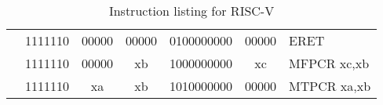 \begin{table}[p]
\begin{small}
\begin{center}
\begin{tabular}{rcccccccccl}
&
\multicolumn{2}{|c|}{1111110} &
\multicolumn{1}{c|}{00000} &
\multicolumn{1}{c|}{00000} &
\multicolumn{4}{c|}{0100000000} &
\multicolumn{1}{c|}{00000} & ERET  \\
\cline{2-10}
  

&
\multicolumn{2}{|c|}{1111110} &
\multicolumn{1}{c|}{00000} &
\multicolumn{1}{c|}{xb} &
\multicolumn{4}{c|}{1000000000} &
\multicolumn{1}{c|}{xc} & MFPCR xc,xb \\
\cline{2-10}
  

&
\multicolumn{2}{|c|}{1111110} &
\multicolumn{1}{c|}{xa} &
\multicolumn{1}{c|}{xb} &
\multicolumn{4}{c|}{1010000000} &
\multicolumn{1}{c|}{00000} & MTPCR xa,xb \\
\cline{2-10}
  

\end{tabular}
\end{center}
\end{small}
\caption{Instruction listing for RISC-V}
\label{instr-table}
\end{table}
  
